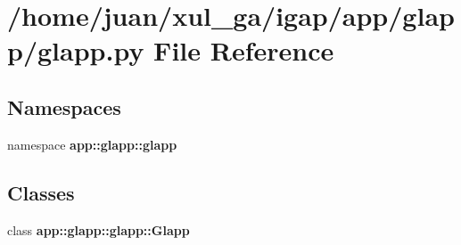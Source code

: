 \section{/home/juan/xul\_\-ga/igap/app/glapp/glapp.py File Reference}
\label{glapp_8py}
\subsection*{Namespaces}
\begin{CompactItemize}
\item 
namespace {\bf app::glapp::glapp}
\end{CompactItemize}
\subsection*{Classes}
\begin{CompactItemize}
\item 
class {\bf app::glapp::glapp::Glapp}
\end{CompactItemize}
